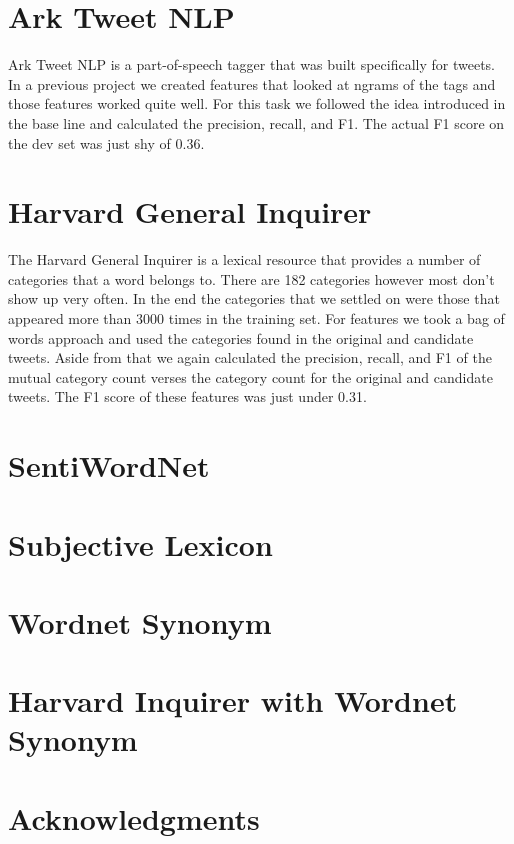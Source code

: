\documentclass[11pt,letterpaper]{article}
\begin{document}
\section{Ark Tweet NLP}
Ark Tweet NLP is a part-of-speech tagger that was built specifically for tweets. In a previous project we created features that looked at ngrams of the tags and those features worked quite well. For this task we followed the idea introduced in the base line and calculated the precision, recall, and F1. The actual F1 score on the dev set was just shy of 0.36.

\section{Harvard General Inquirer}
The Harvard General Inquirer is a lexical resource that provides a number of categories that a word belongs to. There are 182 categories however most don't show up very often. In the end the categories that we settled on were those that appeared more than 3000 times in the training set. For features we took a bag of words approach and used the categories found in the original and candidate tweets. Aside from that we again calculated the precision, recall, and F1 of the mutual category count verses the category count for the original and candidate tweets. The F1 score of these features was just under 0.31.

\section{SentiWordNet}

\section{Subjective Lexicon}

\section{Wordnet Synonym}

\section{Harvard Inquirer with Wordnet Synonym}

\section*{Acknowledgments}
\end{document}
